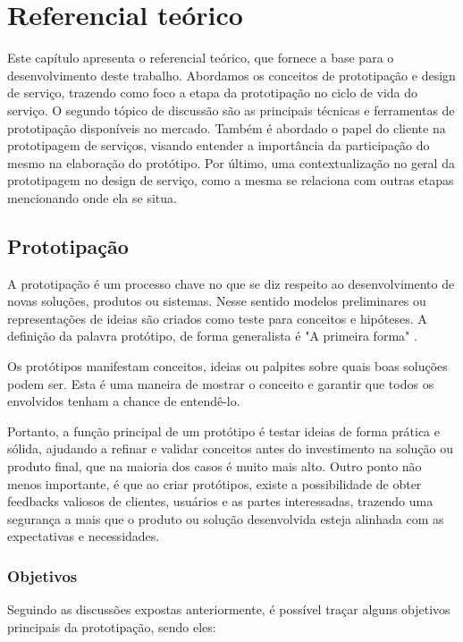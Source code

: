 \chapter[Referencial teórico]{Referencial teórico}

Este capítulo apresenta o referencial teórico, que fornece a base para o desenvolvimento deste trabalho. Abordamos os conceitos de prototipação e design de serviço, trazendo como foco a etapa da prototipação no ciclo de vida do serviço. O segundo tópico de discussão são as principais técnicas e ferramentas de prototipação disponíveis no mercado. Também é abordado o papel do cliente na prototipagem de serviços, visando entender a importância da participação do mesmo na elaboração do protótipo. Por último, uma contextualização no geral da prototipagem no design de serviço, como a mesma se relaciona com outras etapas mencionando onde ela se situa.  

\section{Prototipação}

A prototipação é um processo chave no que se diz respeito ao desenvolvimento de novas soluções, produtos ou sistemas. Nesse sentido modelos preliminares ou representações de ideias são criados como teste para conceitos e hipóteses. A definição da palavra protótipo, de forma generalista é "A primeira forma" \cite{Blomkvist2011existing}.

Os protótipos manifestam conceitos, ideias ou palpites sobre quais boas soluções podem ser. Esta é uma maneira de mostrar o conceito e garantir que todos os envolvidos tenham a chance de entendê-lo. \cite{Blomkvist2014}

Portanto, a função principal de um protótipo é testar ideias de forma prática e sólida, ajudando a refinar e validar conceitos antes do investimento na solução ou produto final, que na maioria dos casos é muito mais alto. Outro ponto não menos importante, é que ao criar protótipos, existe a possibilidade de obter feedbacks valiosos de clientes, usuários e as partes interessadas, trazendo uma segurança a mais que o produto ou solução desenvolvida esteja alinhada com as expectativas e necessidades.

\subsection{Objetivos}

Seguindo as discussões expostas anteriormente, é possível traçar alguns objetivos principais da prototipação, sendo eles:

